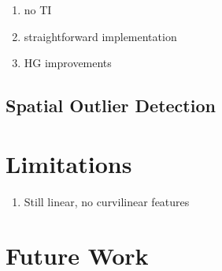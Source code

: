 \begin{enumerate}
    \item no TI
    \item straightforward implementation
    \item HG improvements
\end{enumerate}


\subsection{Spatial Outlier Detection}
\label{subsec:07outlier}


\FloatBarrier
\section{Limitations}
\label{sec:07limit}

\begin{enumerate}
    \item Still linear, no curvilinear features
\end{enumerate}



\FloatBarrier
\section{Future Work}
\label{sec:07fwork}

